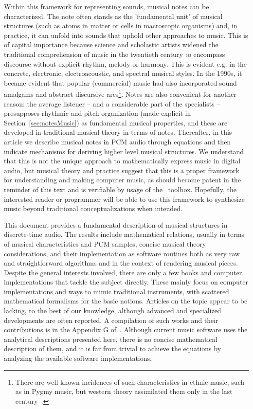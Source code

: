 Within this framework for representing sounds,
musical notes can be characterized.
The note often stands as the 'fundamental unit' of musical structures
(such as atoms in matter or cells in macroscopic organisms) and,
in practice, it can unfold into sounds that uphold other approaches to music.
This is of capital importance because science and scholastic artists
widened the traditional comprehension of music in the twentieth century
to encompass discourse without explicit rhythm, melody or harmony.
This is evident e.g. in the concrete, electronic, electroacoustic,
and spectral musical styles.
In the 1990s, it became evident that popular
(commercial) music had also incorporated
sound amalgams and abstract discursive arcs\footnote{There
are well known incidences of such characteristics in ethnic music,
such as in Pygmy music, but western theory assimilated them
only in the last century~\cite{Wisnick}.}.
Notes are also convenient for another reason:
the average listener -- and a considerable part of the specialists --
presupposes rhythmic and pitch organization 
(made explicit in Section~\ref{sec:notesMusic})
as fundamental musical properties,
and these are developed in traditional musical theory in terms of notes.
Thereafter, in this article we describe musical notes in PCM audio through equations
and then indicate mechanisms for deriving higher level musical structures.
We understand that this is not the unique approach to mathematically express music in
digital audio, but musical theory and practice suggest that
this is a proper framework for understanding and making computer music,
as should become patent in the reminder of this text and is verifiable
by usage of the \massa\ toolbox.
Hopefully, the interested reader or programmer will be able to use
this framework to synthesize music beyond traditional conceptualizations when intended.

This document provides a
fundamental description of musical structures
in discrete-time audio.
The results include mathematical relations,
usually in terms of musical characteristics and PCM samples,
concise musical theory considerations,
and their implementation as software routines both as
very raw and straightforward algorithms and in the context of rendering musical pieces.
Despite the general interests involved,
there are only a few books and computer implementations that tackle the subject directly.
These mainly focus on computer implementations and ways to mimic traditional instruments,
with scattered mathematical formalisms for the basic notions.
Articles on the topic appear to be lacking, to the best of our knowledge,
although advanced and specialized developments are often reported.
A compilation of such works and their contributions is in the Appendix G of~\cite{dissertacao}.
Although current music software uses the analytical descriptions presented here,
there is no concise mathematical description of them, and it is far from trivial
to achieve the equations by analyzing the available software implementations.

